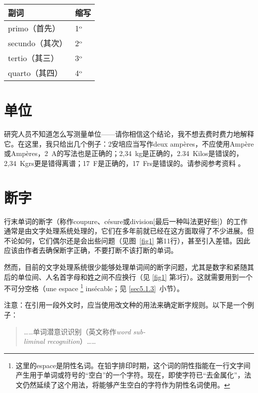 \begin{center}
    \begin{tabular}{|l|l|}
        \hline
        副词 & 缩写\\
        \hline
        primo（首先） & 1$^{\rm o}$ \\
        secundo（其次） & 2$^{\rm o}$ \\
        tertio（其三） & 3$^{\rm o}$ \\
        quarto（其四） & 4$^{\rm o}$ \\
        \hline
    \end{tabular}
\end{center}

\section{单位}

研究人员不知道怎么写测量单位——请你相信这个结论，我不想去费时费力地解释它。在这里，我只给出几个例子：2安培应当写作deux ampères，不应使用Ampère或Ampères，2~A的写法也是正确的；2,34~kg是正确的，2.34~Kilos是错误的，2,34~Kgrs更是错得离谱；17~F是正确的，17~Frs是错误的。请参阅参考资料%
。

\section{断字}

行末单词的断字（称作coupure、césure或division[最后一种叫法更好些]）的工作通常是由文字处理系统处理的，它们在多年前就已经在这方面取得了不少进展。但不论如何，它们偶尔还是会出些问题（见图~\ref{fig1} 第11行），甚至引入差错。因此应该由作者去确保断字正确，不要打断不该打断的单词。

然而，目前的文字处理系统很少能够处理单词间的断字问题，尤其是数字和紧随其后的单位间、人名首字母和姓之间不应换行（见 \ref{fig1} 第3行）。这就需要用到一个不可分空格（une espace
    \footnote{这里的espace是阴性名词。在铅字排印时期，这个词的阴性指能在一行文字间产生用于单词或符号的``空白''的一个字符。现在，即使字符已``去金属化''，法文仍然延续了这个用法，将能够产生空白的字符作为阴性名词使用。}
insécable；见 \ref{sec5.1.3}~小节）。

注意：在引用一段外文时，应当使用改文种的用法来确定断字规则。以下是一个例子：

\begin{quote}
    ……单词潜意识识别（英文称作\emph{word sub-\\
    liminal recognition}）……
\end{quote}


